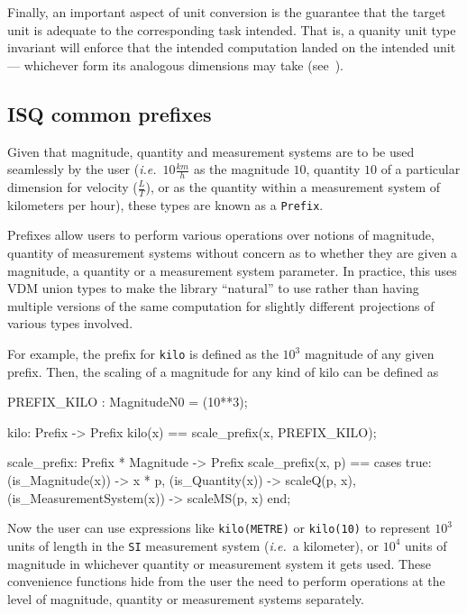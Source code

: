 \documentclass[runningheads,a4paper]{llncs}
\begin{document}
Finally, an important aspect of unit conversion is the guarantee that the target unit is adequate to the corresponding task intended. That is, a quanity unit type invariant will enforce that the intended computation landed on the intended unit --- whichever form its analogous dimensions may take (see~). 

\subsection*{ISQ common prefixes}

Given that magnitude, quantity and measurement systems are to be used seamlessly by the user (\textit{i.e.}~\(10\frac{km}{h}\) as the magnitude \(10\), quantity \(10\) of a particular dimension for velocity (\(\frac{L}{T}\)), or as the quantity within a measurement system of kilometers per hour), these types are known as a \texttt{Prefix}. 

Prefixes allow users to perform various operations over notions of magnitude, quantity of measurement systems without concern as to whether they are given a magnitude, a quantity or a measurement system parameter. In practice, this uses VDM union types to make the library ``natural'' to use rather than having multiple versions of the same computation for slightly different projections of various types involved. 

For example, the prefix for \texttt{kilo} is defined as the \(10^3\) magnitude of any given prefix. Then, the scaling of a magnitude for any kind of kilo can be defined as
%
\begin{vdmsl}[frame=none,basicstyle=\ttfamily\scriptsize]
    PREFIX_KILO   : MagnitudeN0 = (10**3);

    kilo: Prefix -> Prefix
    kilo(x) == scale_prefix(x, PREFIX_KILO);

    scale_prefix: Prefix * Magnitude -> Prefix
    scale_prefix(x, p) == 
        cases true:
            (is_Magnitude(x))         -> x * p,
            (is_Quantity(x))          -> scaleQ(p, x),
            (is_MeasurementSystem(x)) -> scaleMS(p, x)
        end;
\end{vdmsl}
%
\noindent Now the user can use expressions like \texttt{kilo(METRE)} or \texttt{kilo(10)} to represent \(10^3\) units of length in the \texttt{SI} measurement system (\textit{i.e.}~a kilometer), or \(10^4\) units of magnitude in whichever quantity or measurement system it gets used. These convenience functions hide from the user the need to perform operations at the level of magnitude, quantity or measurement systems separately. 
\end{document}
